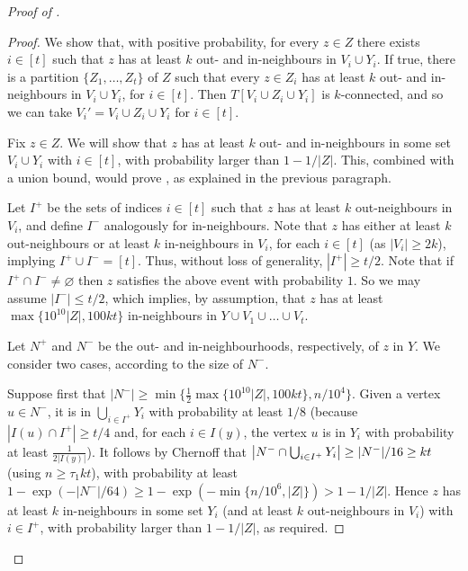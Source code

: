 \documentclass[english]{article}
\theoremstyle{plain}
\theoremstyle{remark}
\def \Np {N^+}
\def \Nm {N^-}
\def \Np {N^+}
\def \Nm {N^-}
\let\emptyset\varnothing
\let\originalleft\left
\let\originalright\right
\renewcommand{\left}{\mathopen{}\mathclose\bgroup\originalleft}
\renewcommand{\right}{\aftergroup\egroup\originalright}
\begin{document}
\begin{proof}[Proof of ]
\begin{proof}
			We show that, with positive probability, for every $z \in Z$ there exists $i \in [t]$ such that $z$ has at least $k$ out- and in-neighbours in $V_i \cup Y_i$. If true, there is a partition $\{Z_1, \ldots, Z_{t}\}$ of $Z$ such that every $z \in Z_i$ has at least $k$ out- and in-neighbours in $V_i \cup Y_i$, for $i \in [t]$. Then $T[V_i \cup Z_i \cup Y_i]$ is $k$-connected, and so we can take $V_i' = V_i \cup Z_i \cup Y_i$ for $i \in [t]$.

			Fix $z \in Z$. We will show that $z$ has at least $k$ out- and in-neighbours in some set $V_i \cup Y_i$ with $i \in [t]$, with probability larger than $1 - 1/|Z|$. This, combined with a union bound, would prove , as explained in the previous paragraph.

			\def \Ip {I^+}
			\def \Im {I^-}
			Let $\Ip$ be the sets of indices $i \in [t]$ such that $z$ has at least $k$ out-neighbours in $V_i$, and define $\Im$ analogously for in-neighbours.
			Note that $z$ has either at least $k$ out-neighbours or at least $k$ in-neighbours in $V_i$, for each $i \in [t]$ (as $|V_i| \ge 2k$), implying $\Ip \cup \Im = [t]$.
			Thus, without loss of generality, $|\Ip| \ge t/2$. Note that if $\Ip \cap \Im \neq \emptyset$ then $z$ satisfies the above event with probability $1$. So we may assume $|\Im| \le t/2$, which implies, by assumption, that $z$ has at least $\max\{10^{10}|Z|, 100kt\}$ in-neighbours in $Y \cup V_1 \cup \ldots \cup V_t$.

			Let $\Np$ and $\Nm$ be the out- and in-neighbourhoods, respectively, of $z$ in $Y$. 
			We consider two cases, according to the size of $\Nm$.

			Suppose first that $|\Nm| \ge \min\{\frac{1}{2}\max\{10^{10} |Z|, 100kt\}, n/10^4\}$. Given a vertex $u \in \Nm$, it is in $\bigcup_{i \in \Ip} Y_i$ with probability at least $1/8$ (because $|I(u) \cap \Ip| \ge t/4$ and, for each $i \in I(y)$, the vertex $u$ is in $Y_i$ with probability at least $\frac{1}{2|I(y)|}$). It follows by Chernoff that $\left|\Nm \cap \bigcup_{i \in \Ip} Y_i\right| \ge |\Nm|/16 \ge kt$ (using $n \ge \tau_1 kt$), with probability at least $1 - \exp(-|\Nm|/64) \ge 1 - \exp(-\min\{n/10^{6}, |Z|\}) > 1 - 1 / |Z|$. Hence $z$ has at least $k$ in-neighbours in some set $Y_i$ (and at least $k$ out-neighbours in $V_i$) with $i \in \Ip$, with probability larger than $1 - 1 / |Z|$, as required.


\end{proof}
\end{proof}
\end{document}
